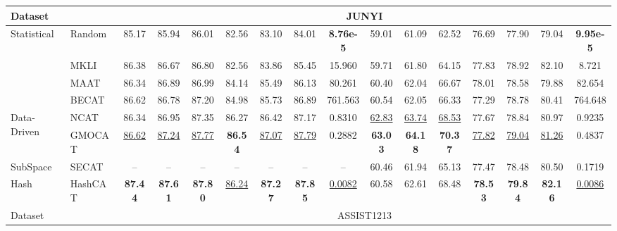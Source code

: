 \begin{table}[!t]
{\begin{tabular}{l l|ccc|ccc|c|ccc|ccc|c}
    \midrule
    \multicolumn{2}{l|}{Dataset} & \multicolumn{14}{c}{JUNYI} \\
    \midrule
    \multirow{4}[8]{*}{Statistical} & Random & 85.17 & 85.94 & 86.01 & 82.56 & 83.10 & 84.01 & \textbf{8.76e-5} &59.01 & 61.09 & 62.52 & 76.69 & 77.90 & 79.04 & \textbf{9.95e-5} \\
    \cmidrule{3-16} & MKLI &86.38 & 86.67 & 86.80 & 82.56 & 83.86 & 85.45  & 15.960 &59.71 & 61.80 & 64.15 & 77.83 & 78.92 & 82.10  & 8.721 \\
    \cmidrule{3-16} & MAAT & 86.34 & 86.89 & 86.99 & 84.14 & 85.49 & 86.13  & 80.261 &60.40 & 62.04 & 66.67 & 78.01 & 78.58 & 79.88 &  82.654\\
    \cmidrule{3-16} & BECAT & 86.62 & 86.78 & 87.20 &84.98  &85.73  & 86.89 &761.563  & 60.54& 62.05&66.33 &77.29 & 78.78& 80.41& 764.648\\
    \midrule
    \multirow{2}{*}{Data-Driven} & NCAT & 86.34 & 86.95 & 87.35 & 86.27 &86.42  &87.17 & 0.8310 & \underline{62.83}&\underline{63.74} &\underline{68.53} & 77.67& 78.84&80.97 &0.9235 \\
    \cmidrule{3-16} & GMOCAT & \underline{86.62} &\underline{87.24}  &\underline{87.77} & \textbf{86.54} & \underline{87.07} &\underline{87.79} & 0.2882 &\textbf{63.03} &\textbf{64.18} & \textbf{70.37}&\underline{77.82} &\underline{79.04} &\underline{81.26}  &0.4837 \\
    \midrule
    SubSpace & SECAT & -- &--  & -- & -- &-- & -- & --& 60.46 & 61.94 & 65.13 & 77.47 & 78.48 & 80.50 & 0.1719  \\
    \midrule
    Hash & HashCAT & \cellcolor{gray!25}\textbf{87.44} & \cellcolor{gray!25}\textbf{87.61} & \cellcolor{gray!25}\textbf{87.80} & \cellcolor{gray!25}\underline{86.24} & \cellcolor{gray!25}\textbf{87.27} & \cellcolor{gray!25}\textbf{87.85} & \cellcolor{gray!25}\underline{0.0082}& \cellcolor{gray!25}60.58 & \cellcolor{gray!25}62.61 & \cellcolor{gray!25}68.48 & \cellcolor{gray!25}\textbf{78.53} & \cellcolor{gray!25}\textbf{79.84} & \cellcolor{gray!25}\textbf{82.16} & \cellcolor{gray!25}\underline{0.0086} \\
 \midrule
    \multicolumn{2}{l|}{Dataset} & \multicolumn{14}{c}{ASSIST1213} \\
    \midrule
    

\end{tabular}}
\end{table}
